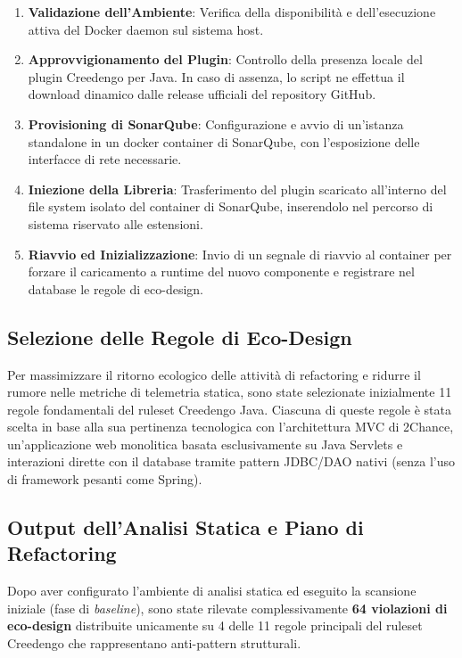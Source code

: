 \begin{enumerate}
    \item \textbf{Validazione dell'Ambiente}: Verifica della disponibilità e dell'esecuzione attiva del Docker daemon sul sistema host.
    \item \textbf{Approvvigionamento del Plugin}: Controllo della presenza locale del plugin Creedengo per Java. In caso di assenza, lo script ne effettua il download dinamico dalle release ufficiali del repository GitHub.
    \item \textbf{Provisioning di SonarQube}: Configurazione e avvio di un'istanza standalone in un docker container di SonarQube, con l'esposizione delle interfacce di rete necessarie.
    \item \textbf{Iniezione della Libreria}: Trasferimento del plugin scaricato all'interno del file system isolato del container di SonarQube, inserendolo nel percorso di sistema riservato alle estensioni.
    \item \textbf{Riavvio ed Inizializzazione}: Invio di un segnale di riavvio al container per forzare il caricamento a runtime del nuovo componente e registrare nel database le regole di eco-design.
\end{enumerate}

\subsection{Selezione delle Regole di Eco-Design}
Per massimizzare il ritorno ecologico delle attività di refactoring e ridurre il rumore nelle metriche di telemetria statica, sono state selezionate inizialmente 11 regole fondamentali del ruleset Creedengo Java. Ciascuna di queste regole è stata scelta in base alla sua pertinenza tecnologica con l'architettura MVC di 2Chance, un'applicazione web monolitica basata esclusivamente su Java Servlets e interazioni dirette con il database tramite pattern JDBC/DAO nativi (senza l'uso di framework pesanti come Spring).

\subsection{Output dell'Analisi Statica e Piano di Refactoring}
Dopo aver configurato l'ambiente di analisi statica ed eseguito la scansione iniziale (fase di \textit{baseline}), sono state rilevate complessivamente \textbf{64 violazioni di eco-design} distribuite unicamente su 4 delle 11 regole principali del ruleset Creedengo che rappresentano anti-pattern strutturali. 


